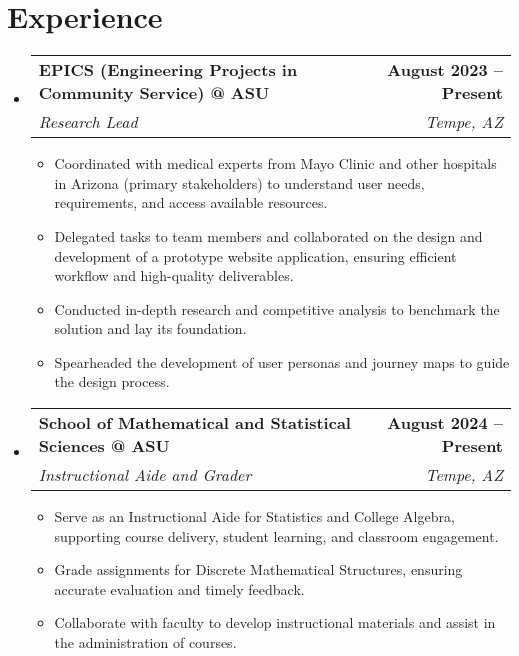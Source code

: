 \documentclass[letterpaper,11pt]{article}
\makeatletter
\newcommand{\resumeItem}[1]{
  \item\small{
    {#1 \vspace{-2pt}}
  }
}
\newcommand{\resumeSubheading}[4]{
  \vspace{-2pt}\item
    \begin{tabular*}{1.0\textwidth}[t]{l@{\extracolsep{\fill}}r}
      \textbf{#1} & \textbf{\small #2} \\
      \textit{\small#3} & \textit{\small #4} \\
    \end{tabular*}\vspace{-7pt}
}
\newcommand{\resumeSubHeadingListStart}{\begin{itemize}[leftmargin=0.0in, label={}]}
\newcommand{\resumeSubHeadingListEnd}{\end{itemize}}
\newcommand{\resumeItemListStart}{\begin{itemize}}
\newcommand{\resumeItemListEnd}{\end{itemize}\vspace{-5pt}}
\makeatother
\begin{document}
\section{Experience}
  \resumeSubHeadingListStart

    \resumeSubheading
      {EPICS (Engineering Projects in Community Service) @ ASU}{August 2023 -- Present}
      {Research Lead}{Tempe, AZ}
      \resumeItemListStart
        \resumeItem{Coordinated with medical experts from Mayo Clinic and other hospitals in Arizona (primary stakeholders) to understand user needs, requirements, and access available resources.}
        \resumeItem{Delegated tasks to team members and collaborated on the design and development of a prototype website application, ensuring efficient workflow and high-quality deliverables.}
        \resumeItem{Conducted in-depth research and competitive analysis to benchmark the solution and lay its foundation.}
        \resumeItem{Spearheaded the development of user personas and journey maps to guide the design process.}
      \resumeItemListEnd

    \resumeSubheading
      {School of Mathematical and Statistical Sciences @ ASU}{August 2024 -- Present}
      {Instructional Aide and Grader}{Tempe, AZ}
      \resumeItemListStart
        \resumeItem{Serve as an Instructional Aide for Statistics and College Algebra, supporting course delivery, student learning, and classroom engagement.}
        \resumeItem{Grade assignments for Discrete Mathematical Structures, ensuring accurate evaluation and timely feedback.}
        \resumeItem{Collaborate with faculty to develop instructional materials and assist in the administration of courses.}
      \resumeItemListEnd
    
  \resumeSubHeadingListEnd
\vspace{-16pt}

\end{document}
